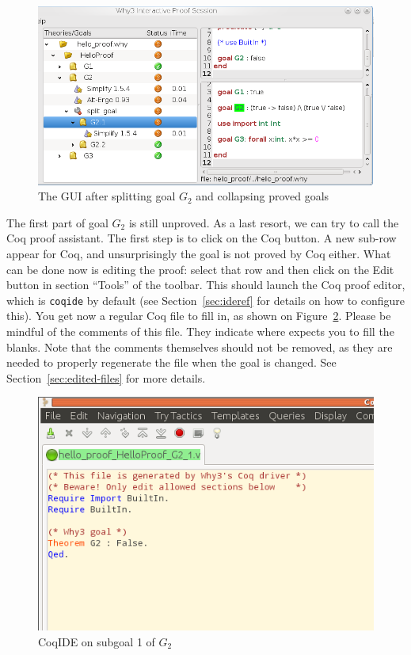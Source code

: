 \begin{figure}[tbp]
 \includegraphics[width=\textwidth]{gui-0-70-4.png}
  \caption{The GUI after splitting goal $G_2$ and collapsing proved goals}
  \label{fig:gui4}
\end{figure}

The first part of goal $G_2$ is still unproved. As a last resort, we
can try to call the Coq proof assistant. The first step is to click on
the \textsf{Coq} button. A new sub-row appear for Coq, and
unsurprisingly the goal is not proved by Coq either. What can be done
now is editing the proof: select that row and then click on the
\textsf{Edit} button in section ``Tools'' of the toolbar. This should
launch the Coq proof editor, which is \texttt{coqide} by default (see
Section~\ref{sec:ideref} for details on how to configure this). You get
now a regular Coq file to fill in, as shown on Figure~\ref{fig:coqide}.
Please be mindful of the comments of this file. They indicate where \why
expects you to fill the blanks. Note that the comments themselves should
not be removed, as they are needed to properly regenerate the file when the
goal is changed. See Section~\ref{sec:edited-files} for more details.

\begin{figure}[tbp]
  \includegraphics[width=\textwidth]{coqide-0-81.png}
  \caption{CoqIDE on subgoal 1 of $G_2$}
  \label{fig:coqide}
\end{figure}

